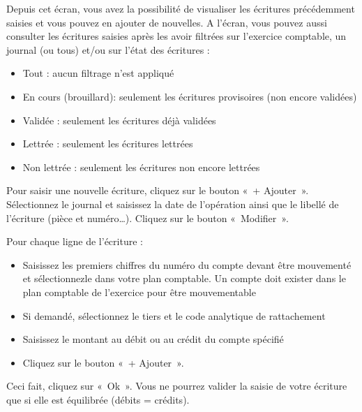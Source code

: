 \documentclass[a4paper,10pt,oneside,french]{sphinxmanual}
\begin{document}
Depuis cet écran, vous avez la possibilité de visualiser les écritures précédemment saisies et vous pouvez en ajouter de nouvelles.
A l’écran, vous pouvez aussi consulter les écritures saisies après les avoir filtrées sur l’exercice comptable, un journal (ou tous)  et/ou sur l’état des écritures :
\begin{itemize}
\item {} 
Tout : aucun filtrage n’est appliqué

\item {} 
En cours (brouillard): seulement les écritures provisoires (non encore validées)

\item {} 
Validée : seulement les écritures déjà validées

\item {} 
Lettrée : seulement les écritures lettrées

\item {} 
Non lettrée : seulement les écritures non encore lettrées

\end{itemize}

Pour saisir une nouvelle écriture, cliquez sur le bouton « + Ajouter ».
Sélectionnez le journal et saisissez la date de l’opération ainsi que le libellé de l’écriture (pièce et numéro…). Cliquez sur le bouton « Modifier ».

Pour chaque ligne de l’écriture :
\begin{itemize}
\item {} 
Saisissez les premiers chiffres du numéro du compte devant être mouvementé et sélectionnez\sphinxhyphen{}le dans votre plan comptable. Un compte doit exister dans le plan comptable de l’exercice pour être mouvementable

\item {} 
Si demandé, sélectionnez le tiers et le code analytique de rattachement

\item {} 
Saisissez le montant au débit ou au crédit du compte spécifié

\item {} 
Cliquez sur le bouton « + Ajouter ».

\end{itemize}

Ceci fait, cliquez sur « Ok ». Vous ne pourrez valider la saisie de votre écriture que si elle est équilibrée (débits = crédits).

\end{document}

